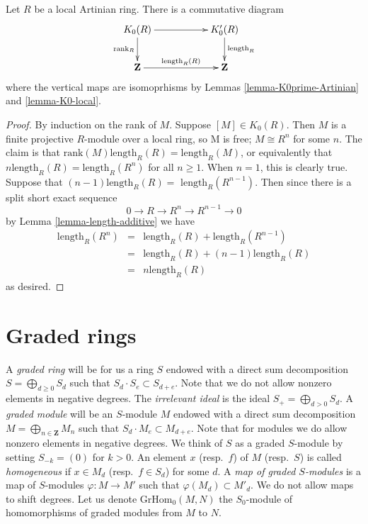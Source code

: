 \begin{lemma}
\label{lemma-K0-and-K0prime-Artinian-local}
Let $R$ be a local Artinian ring. There is a commutative
diagram
$$
\xymatrix{
K_0(R) \ar[rr] \ar[d]_{\text{rank}_R} & &
K_0'(R) \ar[d]^{\text{length}_R} \\
\mathbf{Z} \ar[rr]^{\text{length}_R(R)} & &
\mathbf{Z}
}
$$
where the vertical maps are isomoprhisms by Lemmas
\ref{lemma-K0prime-Artinian} and \ref{lemma-K0-local}.
\end{lemma}

\begin{proof}
By induction on the rank of $M$.
Suppose $\left[M\right] \in K_0(R)$.
Then $M$ is a finite projective $R$-module
over a local ring, so M is free;
$M \cong R^n$ for some $n$.
The claim is that
$\text{rank} (M) \text{length}_R (R) = \text{length}_R(M)$,
or equivalently that $n\text{length}_R(R) = \text{length}_R (R^n)$
for all $n \geq 1$. When $n = 1$, this is clearly true.
Suppose that $(n-1) \text{length}_R(R) =\text{ length}_R(R^{n-1})$.
Then since there is a split short exact sequence
$$
0 \rightarrow R \rightarrow R^n \rightarrow R^{n-1} \rightarrow 0
$$
by Lemma \ref{lemma-length-additive} we have
\begin{eqnarray*}
\text{length}_R(R^n) & = & \text{length}_R(R) + \text{length}_R(R^{n-1}) \\
& = & \text{length}_R(R) + (n-1) \text{length}_R(R) \\
& = & n\text{length}_R(R)
\end{eqnarray*}
as desired.
\end{proof}

















\section{Graded rings}
\label{section-graded}

\noindent
A {\it graded ring} will be for us a ring $S$ endowed
with a direct sum decomposition $S = \bigoplus_{d \geq 0} S_d$
such that $S_d \cdot S_e \subset S_{d + e}$.
Note that we do not allow nonzero elements in negative degrees.
The {\it irrelevant ideal} is the ideal $S_{+} = \bigoplus_{d > 0} S_d$.
A {\it graded module}
will be an $S$-module $M$ endowed with a direct sum decomposition
$M = \bigoplus_{n\in \mathbf{Z}} M_n$ such that $S_d \cdot M_e
\subset M_{d + e}$. Note that for modules we do allow
nonzero elements in negative degrees.
We think of $S$ as a graded $S$-module by setting $S_{-k} = (0)$
for $k > 0$. An element $x$ (resp.\ $f$) of $M$ (resp.\ $S$) is called
{\it homogeneous}
if $x \in M_d$ (resp.\ $f \in S_d$) for some $d$.
A {\it map of graded $S$-modules} is a map of $S$-modules
$\varphi : M \to M'$ such that $\varphi(M_d) \subset M'_d$.
We do not allow maps to shift degrees. Let us denote
$\text{GrHom}_0(M, N)$ the $S_0$-module of homomorphisms
of graded modules from $M$ to $N$.

